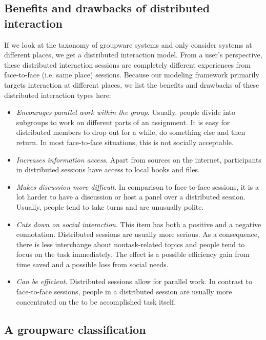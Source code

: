 \subsection{Benefits and drawbacks of distributed interaction}

If we look at the taxonomy of groupware systems and only consider systems at different places, we get a distributed interaction model. From a user's perspective, these distributed interaction sessions are completely different experiences from face-to-face (i.e. same place) sessions. Because our modeling framework primarily targets interaction at different places, we list the benefits and drawbacks of these distributed interaction types here: 

\begin{itemize}
\item{\textit{Encourages parallel work within the group}. Usually, people divide into subgroups to work on different parts of an assignment. It is easy for distributed members to drop out for a while, do something else and then return. In most face-to-face situations, this is not socially acceptable.}
\item{\textit{Increases information access}. Apart from sources on the internet, participants in distributed sessions have access to local books and files.}
\item{\textit{Makes discussion more difficult}. In comparison to face-to-face sessions, it is a lot harder to have a discussion or host a panel over a distributed session. Usually, people tend to take turns and are unusually polite.}
\item{\textit{Cuts down on social interaction}. This item has both a positive and a negative connotation. Distributed sessions are usually more serious. As a consequence, there is less interchange about nontask-related topics and people tend to focus on the task immediately. The effect is a possible efficiency gain from time saved and a possible loss from social needs.}
\item{\textit{Can be efficient}. Distributed sessions allow for parallel work. In contrast to face-to-face sessions, people in a distributed session are usually more concentrated on the to be accomplished task itself.}
\end{itemize}

\subsection{A groupware classification}

